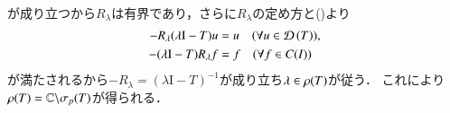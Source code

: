 \begin{prf}
\begin{description}
\begin{align}
				\end{align}
				が成り立つから$R_\lambda$は有界であり，さらに$R_\lambda$の定め方と()より
				\begin{align}
					-R_\lambda (\lambda \mathrm{I} - T) u &= u \quad (\forall u \in \Dom{T} ), \\
					-(\lambda \mathrm{I} - T) R_\lambda f &= f \quad (\forall f \in \c{I})
				\end{align}
				が満たされるから$-R_\lambda = (\lambda \mathrm{I} - T)^{-1}$が成り立ち$\lambda \in \mathfrak{\rho} (T) $が従う．
				これにより$\mathfrak{\rho} (T) = \mathbb{C} \backslash \mathfrak{\sigma}_p (T) $が得られる．
				\QED
		\end{description}
	\end{prf}